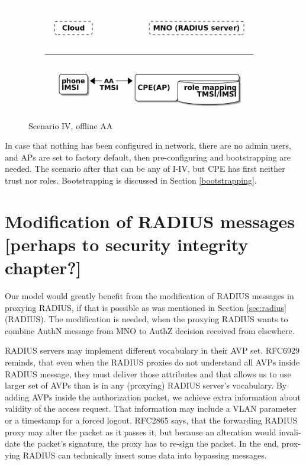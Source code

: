 \documentclass[12pt,a4paper,english]{tutthesis}
\begin{document}
\begin{otherlanguage}{english}
\begin{figure}[htb]
\centering
\includegraphics[width=.9\linewidth]{scenIV.png}
\caption{\label{fig:scenario-IV}Scenario IV, offline AA}
\end{figure}







In case that nothing has been configured in network, there are no 
admin users, and APs are set to factory default, then 
pre-configuring and bootstrapping are needed. The scenario after that can be any
of I-IV, but CPE  has first neither trust nor roles. Bootstrapping is discussed in 
Section \ref{bootstrapping}.


\section{Modification of RADIUS messages [perhaps to security integrity chapter?]}
\label{sec-4-3}
\label{sec:radius-macs}

Our model would greatly benefit from the modification of RADIUS messages in proxying
RADIUS, if that is possible as was mentioned in Section \ref{sec:radius}(RADIUS).
The modification is needed, when the proxying RADIUS wants to combine AuthN message
from MNO to AuthZ decision received from elsewhere.




RADIUS servers may implement different vocabulary in their AVP set.
RFC6929\cite{rfc6929} reminds, that even when
the RADIUS proxies do not understand all AVPs inside RADIUS message, they
must deliver those attributes and that allows us to use larger set of AVPs 
than is in any (proxying) RADIUS server's vocabulary.
By adding AVPs inside the authorization packet, we achieve extra
information about validity of the access request.
That information may include a VLAN parameter or a timestamp for a forced
logout.
RFC2865\cite{rfc2865} says, that the forwarding RADIUS proxy may alter
the packet as it passes it, but because an alteration would invalidate the
packet's signature, the proxy has to re-sign the packet.
In the end, proxying RADIUS can technically insert some data into 
bypassing messages.






\end{otherlanguage}
\end{document}
